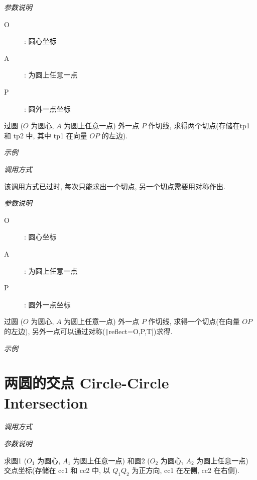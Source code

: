 \emph{参数说明}

\begin{description}
  \item[O]: 圆心坐标
  \item[A]: 为圆上任意一点
  \item[P]: 圆外一点坐标
\end{description}

过圆 ($O$ 为圆心, $A$ 为圆上任意一点) 外一点 $P$ 作切线, 
求得两个切点(存储在tp1 和 tp2 中, 其中 tp1 在向量 $OP$ 的左边).

\emph{示例}


\emph{调用方式}

\begin{tcolorbox}{}
\end{tcolorbox}

\begin{remark*}
  该调用方式已过时, 每次只能求出一个切点, 另一个切点需要用对称作出.
\end{remark*}

\emph{参数说明}

\begin{description}
  \item[O]: 圆心坐标
  \item[A]: 为圆上任意一点
  \item[P]: 圆外一点坐标
\end{description}

过圆 ($O$ 为圆心, $A$ 为圆上任意一点) 外一点 $P$ 作切线, 求得一个切点(在向量 $OP$ 的左边),
另外一点可以通过对称(\texttt|reflect={O,P,T}|)求得.

\emph{示例}


\section{两圆的交点 Circle-Circle Intersection}

\emph{调用方式}

\begin{tcolorbox}{}
\end{tcolorbox}

\emph{参数说明}

求圆1 ($O_1$ 为圆心, $A_1$ 为圆上任意一点)
和圆2 ($O_2$ 为圆心, $A_2$ 为圆上任意一点) 
交点坐标(存储在 cc1 和 cc2 中, 以 $Q_1Q_2$ 为正方向, cc1 在左侧, cc2 在右侧).

